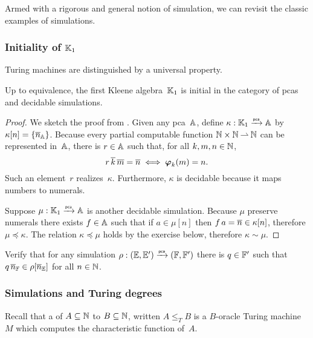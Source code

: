 Armed with a rigorous and general notion of simulation, we can revisit the classic examples of simulations.

\subsubsection{Initiality of $\klone$}
\label{ex:intiality-K1}%

Turing machines are distinguished by a universal property.

\begin{theorem}
  Up to equivalence, the first Kleene algebra~$\klone$ is initial in the category of pcas and decidable simulations.
\end{theorem}

\begin{proof}
  We sketch the proof from \cite[Theorem 2.4.18]{Longley:94}. Given any pca~$\AA$, define $\kappa : \klone \pcato \AA$ by $\kappa[n] = \set{\numeral{n}_{\AA}}$. Because every partial computable function $\NN \times \NN \parto \NN$ can be represented in~$\AA$, there is $r \in \AA$ such that, for all $k, m, n \in \NN$,
  \begin{equation*}
    r \, \numeral{k} \, \numeral{m} = \numeral{n} \iff \pr{k}{m} = n.
  \end{equation*}
  Such an element~$r$ realizes~$\kappa$. Furthermore, $\kappa$ is decidable because it maps numbers to numerals.

  Suppose $\mu : \klone \pcato \AA$ is another decidable simulation. Because $\mu$ preserve numerals there exists $f \in \AA$ such that if $a \in \mu[n]$ then $f \, a = \numeral{n} \in \kappa[n]$, therefore $\mu \preceq \kappa$. The relation $\kappa \preceq \mu$ holds by the exercise below, therefore $\kappa \sim \mu$.
\end{proof}

\begin{exercise}
  Verify that for any simulation $\rho : (\EE, \subEE) \pcato (\FF, \subFF)$ there is $q \in \subFF$ such that $q \, \overline{n}_{\FF} \in \rho[\overline{n}_{\EE}]$ for all $n \in \NN$.
\end{exercise}

\subsubsection{Simulations and Turing degrees}
\label{ex:pcamorphism-turing-degrees}%

Recall that a  of $A \subseteq \NN$ to $B \subseteq \NN$, written $A \leq_T B$ is a $B$-oracle Turing machine~$M$ which computes the characteristic function of~$A$.

